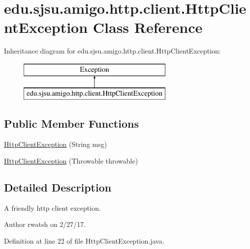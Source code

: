 \hypertarget{classedu_1_1sjsu_1_1amigo_1_1http_1_1client_1_1_http_client_exception}{}\section{edu.\+sjsu.\+amigo.\+http.\+client.\+Http\+Client\+Exception Class Reference}
\label{classedu_1_1sjsu_1_1amigo_1_1http_1_1client_1_1_http_client_exception}
Inheritance diagram for edu.\+sjsu.\+amigo.\+http.\+client.\+Http\+Client\+Exception\+:\begin{figure}[H]
\begin{center}
\leavevmode
\includegraphics[height=2.000000cm]{classedu_1_1sjsu_1_1amigo_1_1http_1_1client_1_1_http_client_exception}
\end{center}
\end{figure}
\subsection*{Public Member Functions}
\begin{DoxyCompactItemize}
\item 
\hyperlink{classedu_1_1sjsu_1_1amigo_1_1http_1_1client_1_1_http_client_exception_ae28a023440de0778d7528430ea9d707e}{Http\+Client\+Exception} (String msg)
\item 
\hyperlink{classedu_1_1sjsu_1_1amigo_1_1http_1_1client_1_1_http_client_exception_a23d35d7d3cc755f29705dd3ff8167b38}{Http\+Client\+Exception} (Throwable throwable)
\end{DoxyCompactItemize}


\subsection{Detailed Description}
A friendly http client exception.

\begin{DoxyAuthor}{Author}
rwatsh on 2/27/17. 
\end{DoxyAuthor}


Definition at line 22 of file Http\+Client\+Exception.\+java.



